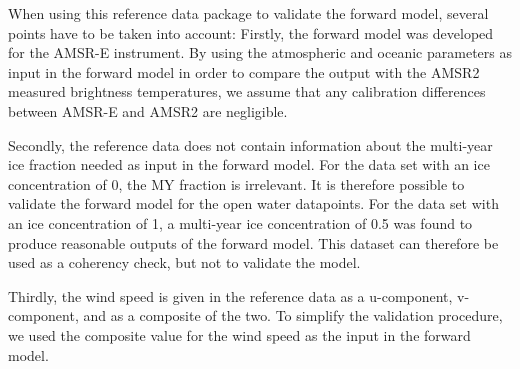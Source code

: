 \documentclass[11pt, a4paper]{article}
\begin{document}
When using this reference data package to validate the forward model, several points have to be taken into account: Firstly, the forward model was developed for the AMSR-E instrument. By using the atmospheric and oceanic parameters as input in the forward model in order to compare the output with the AMSR2 measured brightness temperatures, we assume that any calibration differences between AMSR-E and AMSR2 are negligible. %
\newline

Secondly, the reference data does not contain information about the multi-year ice fraction needed as input in the forward model. %
For the data set with an ice concentration of 0, the MY fraction is irrelevant. It is therefore possible to validate the forward model for the open water datapoints. For the data set with an ice concentration of 1, %
a multi-year ice concentration of 0.5 was found to produce reasonable outputs of the forward model. This dataset can therefore be used as a coherency check, but not to validate the model.
\newline

Thirdly, the wind speed is given in the %
reference data as a u-component, v-component, and as a composite of the two. %
To simplify the validation procedure, we used the composite value for the wind speed as the input in the forward model. %
\newline
\end{document}
